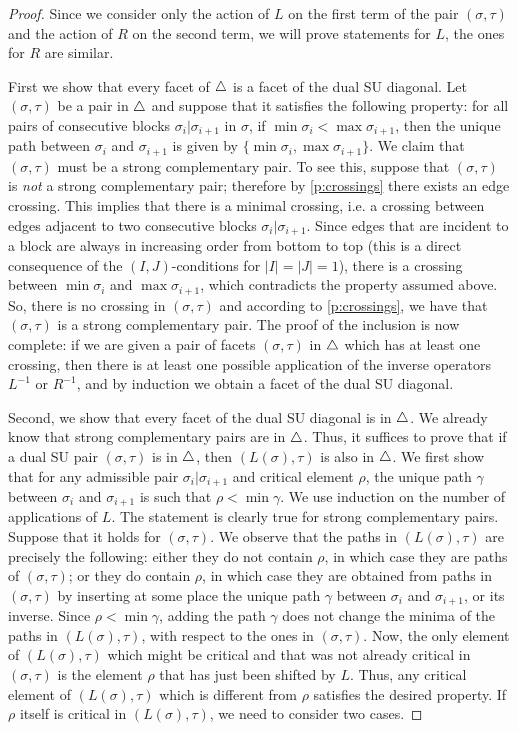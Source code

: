 \begin{proof}
Since we consider only the action of $L$ on the first term of the pair $(\sigma,\tau)$ and the action of $R$ on the second term, we will prove statements for $L$, the ones for $R$ are similar.

First we show that every facet of $\triangle$ is a facet of the dual SU diagonal. 
Let $(\sigma,\tau)$ be a pair in $\triangle$ and suppose that it satisfies the following property: for all pairs of consecutive blocks $\sigma_i | \sigma_{i+1}$ in $\sigma$, if $\min \sigma_i < \max \sigma_{i+1}$, then the unique path between $\sigma_i$ and $\sigma_{i+1}$ is given by $\{\min \sigma_i, \max \sigma_{i+1}\}$. 
We claim that $(\sigma,\tau)$ must be a strong complementary pair. 
To see this, suppose that $(\sigma,\tau)$ is \emph{not} a strong complementary pair; therefore by \cref{p:crossings} there exists an edge crossing. 
This implies that there is a minimal crossing, i.e. a crossing between edges adjacent to two consecutive blocks $\sigma_i | \sigma_{i+1}$. 
Since edges that are incident to a block are always in increasing order from bottom to top (this is a direct consequence of the $(I,J)$-conditions for $|I|=|J|=1$), there is a crossing between $\min \sigma_i$ and $\max \sigma_{i+1}$, which contradicts the property assumed above. 
So, there is no crossing in $(\sigma,\tau)$ and according to \cref{p:crossings}, we have that $(\sigma,\tau)$ is a strong complementary pair. 
The proof of the inclusion is now complete: if we are given a pair of facets $(\sigma,\tau)$ in $\triangle$ which has at least one crossing, then there is at least one possible application of the inverse operators $L^{-1}$ or $R^{-1}$, and by induction we obtain a facet of the dual SU diagonal. 

Second, we show that every facet of the dual SU diagonal is in $\triangle$. 
We already know that strong complementary pairs are in $\triangle$. 
Thus, it suffices to prove that if a dual SU pair $(\sigma,\tau)$ is in $\triangle$, then $(L(\sigma),\tau)$ is also in $\triangle$. 
We first show that for any admissible pair $\sigma_i | \sigma_{i+1}$ and critical element $\rho$, the unique path $\gamma$ between $\sigma_i$ and $\sigma_{i+1}$ is such that $\rho < \min \gamma$. 
We use induction on the number of applications of $L$. 
The statement is clearly true for strong complementary pairs. 
Suppose that it holds for $(\sigma,\tau)$. 
We observe that the paths in $(L(\sigma), \tau)$ are precisely the following: either they do not contain $\rho$, in which case they are paths of $(\sigma, \tau)$; or they do contain $\rho$, in which case they are obtained from paths in $(\sigma,\tau)$ by inserting at some place the unique path $\gamma$ between $\sigma_i$ and $\sigma_{i+1}$, or its inverse. 
Since $\rho < \min \gamma$, adding the path $\gamma$ does not change the minima of the paths in $(L(\sigma), \tau)$, with respect to the ones in $(\sigma, \tau)$.
Now, the only element of $(L(\sigma),\tau)$ which might be critical and that was not already critical in $(\sigma,\tau)$ is the element $\rho$ that has just been shifted by $L$.
Thus, any critical element of $(L(\sigma),\tau)$ which is different from $\rho$ satisfies the desired property. 
If $\rho$ itself is critical in $(L(\sigma),\tau)$, we need to consider two cases. 


\end{proof}
